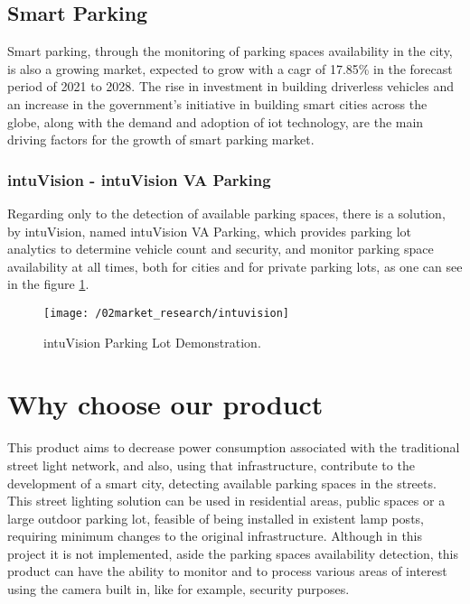 \subsection{Smart Parking}
Smart parking, through the monitoring of parking spaces availability in the city, is also a growing market, expected to grow with a \ac{cagr} of 17.85\% in the forecast period of 2021 to 2028.\cite{smart_parking_market} The rise in investment in building driverless vehicles and an increase in the government’s initiative in building smart cities across the globe, along with the demand and adoption of \ac{iot} technology, are the main driving factors for the growth of smart parking market.

\subsubsection{intuVision - intuVision VA Parking}
Regarding only to the detection of available parking spaces, there is a solution, by intuVision, named intuVision VA Parking, which provides parking lot analytics to determine vehicle count and security, and monitor parking space availability at all times, both for cities and for private parking lots, as one can see in the figure \ref{fig:intuvision}.\cite{parking}

\begin{figure}[ht]
	\centering
	\texttt{[image: /02market\_research/intuvision]}
	\caption{intuVision Parking Lot Demonstration.}
	\label{fig:intuvision}
\end{figure}

\section{Why choose our product}
This product aims to decrease power consumption associated with the traditional street light network, and also, using that infrastructure, contribute to the development of a smart city, detecting available parking spaces in the streets. This street lighting solution can be used in residential areas, public spaces or a large outdoor parking lot, feasible of being installed in existent lamp posts, requiring minimum changes to the original infrastructure. Although in this project it is not implemented, aside the parking spaces availability detection, this product can have the ability to monitor and to process various areas of interest using the camera built in, like for example, security purposes.
